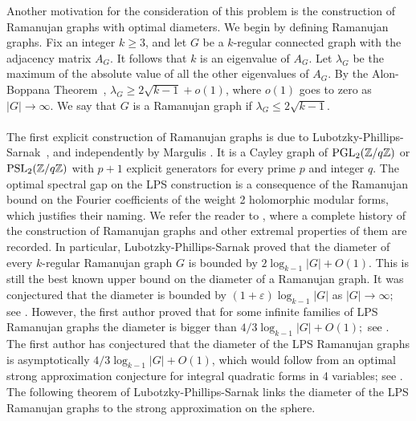 \documentclass[11pt]{amsart}
\theoremstyle{plain}
\theoremstyle{plain}
\theoremstyle{remark}
\theoremstyle{definition}
\newcommand{\PGL}{\textup{PGL}}
\newcommand{\PSL}{\textup{PSL}}
\begin{document}
Another motivation for the consideration of this problem is the construction of Ramanujan graphs with optimal diameters. We begin by defining Ramanujan graphs. Fix an integer $k\geq 3$, and let $G$ be a $k$-regular connected graph with the adjacency matrix  $A_G.$ It follows that $k$ is an eigenvalue of $A_G$. Let $\lambda_G$ be the maximum of the absolute value of all the other eigenvalues of $A_G$. By the Alon-Boppana Theorem~\cite{Lubotzky1988}, $\lambda_G\geq 2\sqrt{k-1}+o(1)$, where $o(1)$ goes to zero as $|G|\to \infty$.  We say that $G$ is a Ramanujan graph if  $\lambda_G \leq 2\sqrt{k-1}.$\\
\\
The first explicit construction of Ramanujan graphs is due to Lubotzky-Phillips-Sarnak~\cite{Lubotzky1988}, and independently by Margulis \cite{Margulis}. It is a Cayley graph of $\PGL_2(\mathbb{Z}/q\mathbb{Z})$ or $\PSL_2(\mathbb{Z}/q\mathbb{Z})$ with $p+1$ explicit generators for every prime $p$ and integer $q$.   The optimal spectral gap on the LPS construction is a consequence of the Ramanujan bound on the Fourier coefficients of the weight 2 holomorphic modular forms, which justifies their naming. 
  We refer the reader to \cite[Chapter 3]{Peter}, where a complete history of the construction of Ramanujan graphs and other extremal properties of them are recorded. In particular, Lubotzky-Phillips-Sarnak proved that the diameter of every $k$-regular Ramanujan graph $G$ is bounded by $2\log_{k-1}|G|+O(1).$ This is still the best known upper bound on the diameter of a Ramanujan graph. It was conjectured that the diameter is bounded by $(1+\varepsilon)\log_{k-1}|G|$ as $|G|\to \infty;$ see \cite[Chapter 3]{Peter}. However, the first author proved that for some infinite families of LPS Ramanujan graphs the diameter is bigger than $4/3 \log_{k-1}|G|+O(1);$ see \cite{Sardari2018}. The first author has conjectured that the diameter of the LPS Ramanujan graphs is asymptotically $4/3 \log_{k-1}|G|+O(1)$, which would follow from an optimal strong approximation conjecture for integral quadratic forms in 4 variables; see \cite[Conjecture 1.3]{Naser2}. The following theorem of Lubotzky-Phillips-Sarnak  links the diameter of the LPS Ramanujan graphs to the strong approximation on the sphere.   
\end{document}
